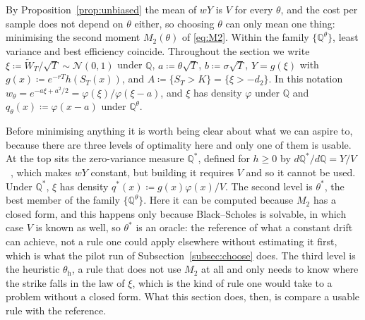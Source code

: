 \documentclass[11pt,a4paper]{article}
\theoremstyle{plain}
\theoremstyle{definition}
\theoremstyle{remark}
\newcommand{\Q}{\mathbb{Q}}
\newcommand{\1}{\mathbf{1}}
\newcommand{\eqdef}{\coloneqq}
\newcommand{\Wt}{\widetilde{W}}
\newcommand{\Qt}{\Q^{\theta}}
\begin{document}
By Proposition~\ref{prop:unbiased} the mean of $wY$ is $V$ for every $\theta$, and the cost per sample does not depend on $\theta$ either, so choosing $\theta$ can only mean one thing: minimising the second moment $M_2(\theta)$ of \eqref{eq:M2}. Within the family $\{\Qt\}$, least variance and best efficiency coincide. Throughout the section we write $\xi \eqdef \Wt_T/\sqrt T \sim \mathcal N(0,1)$ under $\Q$, $a \eqdef \theta\sqrt T$, $b \eqdef \sigma\sqrt T$, $Y = g(\xi)$ with $g(x) \eqdef e^{-rT}h(S_T(x))$, and $A \eqdef \{S_T > K\} = \{\xi > -d_2\}$. In this notation $w_\theta = e^{-a\xi + a^2/2} = \varphi(\xi)/\varphi(\xi - a)$, and $\xi$ has density $\varphi$ under $\Q$ and $q_\theta(x) \eqdef \varphi(x - a)$ under $\Qt$.

Before minimising anything it is worth being clear about what we can aspire to, because there are three levels of optimality here and only one of them is usable. At the top sits the zero-variance measure $\Q^*$, defined for $h \ge 0$ by $d\Q^*/d\Q = Y/V$~\cite[(4.76)]{glasserman}, which makes $wY$ constant, but building it requires $V$ and so it cannot be used. Under $\Q^*$, $\xi$ has density $q^*(x) \eqdef g(x)\varphi(x)/V$. The second level is $\theta^*$, the best member of the family $\{\Qt\}$. Here it can be computed because $M_2$ has a closed form, and this happens only because Black--Scholes is solvable, in which case $V$ is known as well, so $\theta^*$ is an oracle: the reference of what a constant drift can achieve, not a rule one could apply elsewhere without estimating it first, which is what the pilot run of Subsection~\ref{subsec:choose} does. The third level is the heuristic $\theta_{\mathrm h}$, a rule that does not use $M_2$ at all and only needs to know where the strike falls in the law of $\xi$, which is the kind of rule one would take to a problem without a closed form. What this section does, then, is compare a usable rule with the reference.
\end{document}
